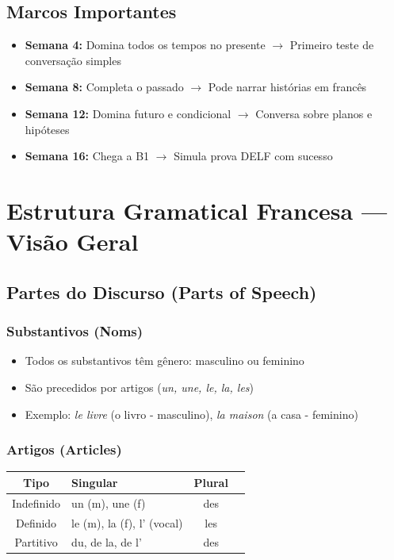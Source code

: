\documentclass[a4paper,12pt]{article}
\begin{document}
\subsection*{Marcos Importantes}
\begin{itemize}
    \item \textbf{Semana 4:} Domina todos os tempos no presente $\to$ Primeiro teste de conversação simples
    \item \textbf{Semana 8:} Completa o passado $\to$ Pode narrar histórias em francês
    \item \textbf{Semana 12:} Domina futuro e condicional $\to$ Conversa sobre planos e hipóteses
    \item \textbf{Semana 16:} Chega a B1 $\to$ Simula prova DELF com sucesso
\end{itemize}

\section{Estrutura Gramatical Francesa — Visão Geral}

\subsection{Partes do Discurso (Parts of Speech)}
\subsubsection{Substantivos (Noms)}
\begin{itemize}
    \item Todos os substantivos têm gênero: masculino ou feminino
    \item São precedidos por artigos (\emph{un, une, le, la, les})
    \item Exemplo: \emph{le livre} (o livro - masculino), \emph{la maison} (a casa - feminino)
\end{itemize}

\subsubsection{Artigos (Articles)}
\begin{tabular}{clcc}
    \toprule
    Tipo & Singular & Plural \\
    \midrule
    Indefinido & un (m), une (f) & des \\
    Definido & le (m), la (f), l' (vocal) & les \\
    Partitivo & du, de la, de l' & des \\
    \bottomrule
\end{tabular}
\end{document}
